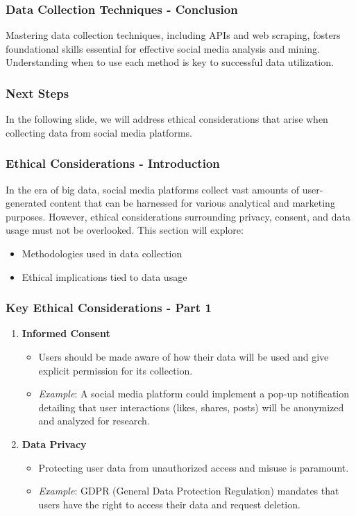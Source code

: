 \documentclass{beamer}
\begin{document}
\begin{frame}
    \frametitle{Data Collection Techniques - Conclusion}
    Mastering data collection techniques, including APIs and web scraping, fosters foundational skills essential for effective social media analysis and mining. Understanding when to use each method is key to successful data utilization.
\end{frame}

\begin{frame}
    \frametitle{Next Steps}
    In the following slide, we will address ethical considerations that arise when collecting data from social media platforms.
\end{frame}

\begin{frame}[fragile]
    \frametitle{Ethical Considerations - Introduction}
    In the era of big data, social media platforms collect vast amounts of user-generated content that can be harnessed for various analytical and marketing purposes. However, ethical considerations surrounding privacy, consent, and data usage must not be overlooked. 
    This section will explore:
    \begin{itemize}
        \item Methodologies used in data collection
        \item Ethical implications tied to data usage
    \end{itemize}
\end{frame}

\begin{frame}[fragile]
    \frametitle{Key Ethical Considerations - Part 1}
    \begin{enumerate}
        \item \textbf{Informed Consent}
            \begin{itemize}
                \item Users should be made aware of how their data will be used and give explicit permission for its collection.
                \item \textit{Example}: A social media platform could implement a pop-up notification detailing that user interactions (likes, shares, posts) will be anonymized and analyzed for research.
            \end{itemize}
        \item \textbf{Data Privacy}
            \begin{itemize}
                \item Protecting user data from unauthorized access and misuse is paramount.
                \item \textit{Example}: GDPR (General Data Protection Regulation) mandates that users have the right to access their data and request deletion.
            \end{itemize}
    \end{enumerate}
\end{frame}
\end{document}
